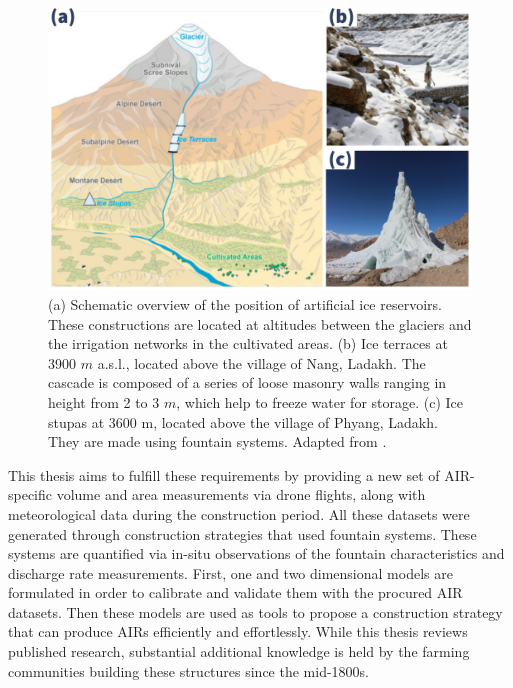 \begin{figure}[t]
	\centering
	\includegraphics[width=\textwidth]{figs/AIR_forms.jpg}

	\caption{ (a) Schematic overview of the position of artificial ice reservoirs. These constructions are located at
		altitudes between the glaciers and the irrigation networks in the cultivated areas. (b) Ice terraces at 3900
		$m$ \ac{a.s.l.}, located above the village of Nang, Ladakh. The cascade is composed of a series of loose masonry walls
		ranging in height from 2 to 3 $m$, which help to freeze water for storage. (c) Ice stupas at 3600 m, located
		above the village of Phyang, Ladakh. They are made using fountain systems. Adapted from \citet{nusserLocalKnowledgeGlobal2016}. }

	\label{fig:AIRforms}
\end{figure}

This thesis aims to fulfill these requirements by providing a new set of AIR-specific volume and area
measurements via drone flights, along with meteorological data during the construction period. All these
datasets were generated through construction strategies that used fountain systems. These systems are quantified
via in-situ observations of the fountain characteristics and discharge rate measurements. First, one and two
dimensional models are formulated in order to calibrate and validate them with the procured AIR datasets. Then
these models are used as tools to propose a construction strategy that can produce \ac{AIRs} efficiently and
effortlessly. While this thesis reviews published research, substantial additional knowledge is held by the
farming communities building these structures since the mid-1800s.


